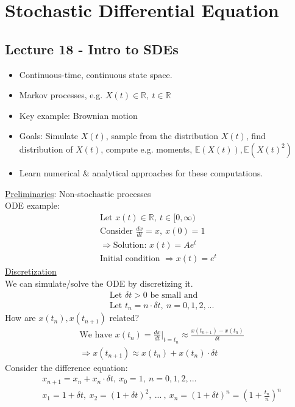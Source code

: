 \documentclass[12pt, letterpaper]{article}
\begin{document}
\section{Stochastic Differential Equation}
\subsection{Lecture 18 - Intro to SDEs}
\begin{itemize}
    \item Continuous-time, continuous state space.
    \item Markov processes, e.g. $X(t) \in \mathbb{R},\ t \in \mathbb{R}$
    \item Key example: Brownian motion
    \item Goals: Simulate $X(t)$, sample from the distribution $X(t)$, find 
    distribution of $X(t)$, compute e.g. moments, $\mathbb{E}(X(t)), \mathbb{E}(X(t)^2)$
    \item Learn numerical \& analytical approaches for these computations.
\end{itemize}
\underline{Preliminaries}: Non-stochastic processes \\
ODE example:
\begin{align*}
    \text{Let } x(t) \in \mathbb{R},\ t \in [0,\infty) \\
    \text{Consider } \frac{dx}{dt} = x,\ x(0) = 1 \\
    \Rightarrow \text{Solution: } x(t) = Ae^t \\
    \text{Initial condition } \Rightarrow x(t) = e^t
\end{align*}
\underline{Discretization} \\
We can simulate/solve the ODE by discretizing it.
\begin{align*}
    &\text{Let } \delta t > 0 \text{ be small and } \\
    &\text{Let } t_n = n\cdot \delta t,\ n = 0,1,2,...
\end{align*}
How are $x(t_n), x(t_{n+1})$ related?
\begin{align*}
    &\text{We have } x(t_n) = \frac{dx}{dt} \Big|_{t=t_n} \approx \frac{x(t_{n+1})-x(t_n)}{\delta t} \\
    &\Rightarrow x(t_{n+1}) \approx x(t_n) + x(t_n) \cdot \delta t
\end{align*}
Consider the difference equation:
\begin{align*}
    &x_{n+1} = x_n + x_n \cdot \delta t,\ x_0 = 1,\ n = 0,1,2,... \\
    &x_1 = 1 + \delta t,\ x_2 = (1+\delta t)^2,\ ...\ ,\ x_n = (1+\delta t)^n = (1+\frac{t_n}{n})^n 
\end{align*}
\end{document}
